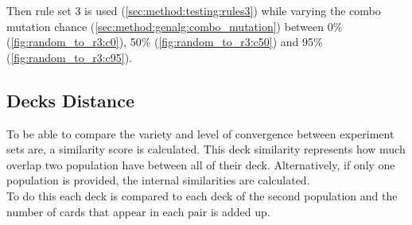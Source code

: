 Then rule set 3 is used (\ref{sec:method:testing:rules3}) while varying the combo mutation chance (\ref{sec:method:genalg:combo_mutation}) between 0\% (\ref{fig:random_to_r3:c0}), 50\% (\ref{fig:random_to_r3:c50}) and 95\% (\ref{fig:random_to_r3:c95}).


\newpage
\subsection{Decks Distance}
\label{ch:results:deck_dist}
To be able to compare the variety and level of convergence between experiment sets are, a similarity score is calculated. This deck similarity represents how much overlap two population have between all of their deck. Alternatively, if only one population is provided, the internal similarities are calculated. \\
To do this each deck is compared to each deck of the second population and the number of cards that appear in each pair is added up. \\

